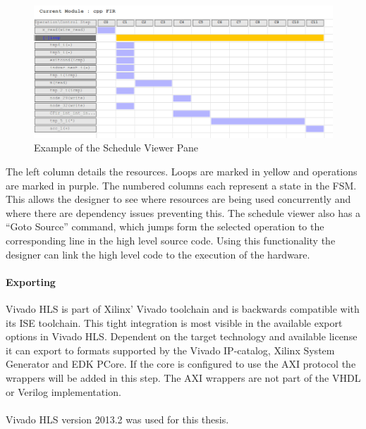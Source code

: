 \begin{figure}[H]
\centering
\includegraphics[scale=0.4]{./images/schedule_viewer_example.png}
\caption{Example of the Schedule Viewer Pane}
\label{img:schedule_viewer}
\end{figure}

The left column details the resources. Loops are marked in yellow and operations are marked in purple. The numbered columns each represent a state in the FSM. This allows the designer to see where resources are being used concurrently and where there are dependency issues preventing this. The schedule viewer also has a ``Goto Source'' command, which jumps form the selected operation to the corresponding line in the high level source code. Using this functionality the designer can link the high level code to the execution of the hardware.

\paragraph{Exporting} Vivado HLS is part of Xilinx' Vivado toolchain and is backwards compatible with its ISE toolchain. This tight integration is most visible in the available export options in Vivado HLS. Dependent on the target technology and available license it can export to formats supported by the Vivado IP-catalog, Xilinx System Generator and EDK PCore. If the core is configured to use the AXI protocol the wrappers will be added in this step. The AXI wrappers are not part of the VHDL or Verilog implementation.
\\\\
Vivado HLS version 2013.2 was used for this thesis. 

